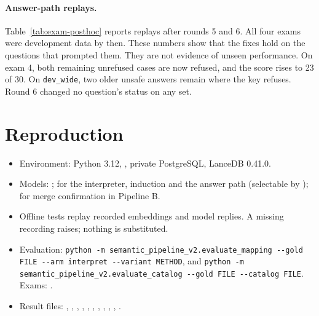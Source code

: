 \documentclass[11pt,a4paper]{article}
\begin{document}
\paragraph{Answer-path replays.} Table~\ref{tab:exam-posthoc} reports replays after rounds 5 and 6. All four exams were development data by then. These numbers show that the fixes hold on the questions that prompted them. They are not evidence of unseen performance. On exam 4, both remaining unrefused cases are now refused, and the score rises to 23 of 30. On \texttt{dev\_wide}, two older unsafe answers remain where the key refuses. Round 6 changed no question's status on any set. %





\section{Reproduction}
\begin{itemize}[nosep]\sloppy
\item Environment: Python 3.12, , private PostgreSQL, LanceDB 0.41.0.
\item Models: ;  for the interpreter, induction and the answer path (selectable by );  for merge confirmation in Pipeline B.
\item Offline tests replay recorded embeddings and model replies. A missing recording raises; nothing is substituted.
\item Evaluation: \texttt{python -m semantic\_pipeline\_v2.evaluate\_mapping -{}-gold FILE -{}-arm interpret -{}-variant METHOD}, and \texttt{python -m semantic\_pipeline\_v2.evaluate\_catalog -{}-gold FILE -{}-catalog FILE}. Exams: .
\item Result files: , , , , , , , , , , .
\end{itemize}
\end{document}

